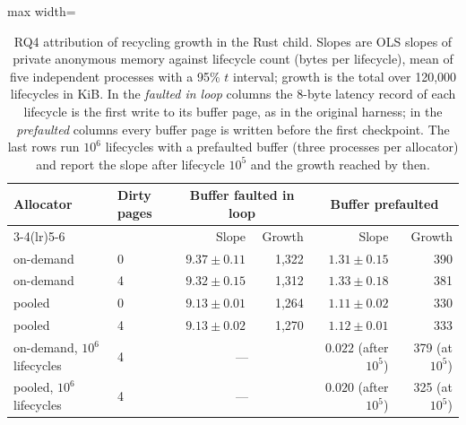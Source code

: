 \begin{table}[t]
\caption{RQ4 attribution of recycling growth in the Rust child. Slopes are OLS slopes of private anonymous memory against lifecycle count (bytes per lifecycle), mean of five independent processes with a 95\% $t$ interval; growth is the total over 120,000 lifecycles in KiB. In the \emph{faulted in loop} columns the 8-byte latency record of each lifecycle is the first write to its buffer page, as in the original harness; in the \emph{prefaulted} columns every buffer page is written before the first checkpoint. The last rows run $10^6$ lifecycles with a prefaulted buffer (three processes per allocator) and report the slope after lifecycle $10^5$ and the growth reached by then.}\label{tab:rq4_slopes}
\footnotesize
\setlength{\tabcolsep}{4pt}%
\begin{adjustbox}{max width=\textwidth}%
\begin{tabular}{llrrrr}
\toprule
Allocator & Dirty pages & \multicolumn{2}{c}{Buffer faulted in loop} & \multicolumn{2}{c}{Buffer prefaulted} \\
\cmidrule(lr){3-4}\cmidrule(lr){5-6}
 & & Slope & Growth & Slope & Growth \\
\midrule
on-demand & 0 & $9.37 \pm 0.11$ & 1,322 & $1.31 \pm 0.15$ & 390 \\
on-demand & 4 & $9.32 \pm 0.15$ & 1,312 & $1.33 \pm 0.18$ & 381 \\
pooled & 0 & $9.13 \pm 0.01$ & 1,264 & $1.11 \pm 0.02$ & 330 \\
pooled & 4 & $9.13 \pm 0.02$ & 1,270 & $1.12 \pm 0.01$ & 333 \\
\midrule
on-demand, $10^6$ lifecycles & 4 & \multicolumn{2}{c}{---} & $0.022$ (after $10^5$) & 379 (at $10^5$) \\
pooled, $10^6$ lifecycles & 4 & \multicolumn{2}{c}{---} & $0.020$ (after $10^5$) & 325 (at $10^5$) \\
\bottomrule
\end{tabular}%
\end{adjustbox}
\end{table}
